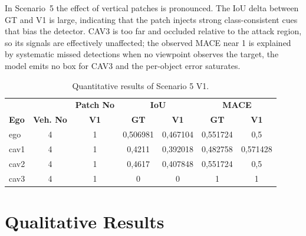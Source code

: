 In Scenario~5 the effect of vertical patches is pronounced. The IoU delta between GT and V1 is large, indicating that the patch injects strong class-consistent cues that bias the detector. 
CAV3 is too far and occluded relative to the attack region, so its signals are effectively unaffected; the observed MACE near 1 is explained by systematic missed detections when no viewpoint observes the target, the model emits no box for CAV3 and the per-object error saturates.



\begin{table}[H]
    \centering
    \caption{Quantitative results of Scenario 5 V1.}
    \label{tab:scenario5v1_results}
    \begin{tabularx}{\textwidth}{l c c c c c c}
        \toprule
            &             &   \multicolumn{1}{c}{\textbf{Patch No}}  & \multicolumn{2}{c}{\textbf{IoU}} & \multicolumn{2}{c}{\textbf{MACE}}                            \\
        \cmidrule(lr){4-5}\cmidrule(lr){6-7}
        \textbf{Ego}           &
        \textbf{Veh. No}       &
        \textbf{V1}      &
        \textbf{GT}            & \textbf{V1}  &
        \textbf{GT}            & \textbf{V1}  \\
        \midrule
        ego         & 4  & 1 & 0,506981 & 0,467104 & 0,551724 & 0,5 \\
        cav1        & 4  & 1 & 0,4211 & 0,392018 & 0,482758 & 0,571428 \\
        cav2        & 4  & 1 & 0,4617 & 0,407848 & 0,551724 & 0,5 \\
        cav3        & 4  & 1 & 0 & 0 & 1 & 1 \\
        \bottomrule
    \end{tabularx}
\end{table}

\section{Qualitative Results}
\label{sec:qualitative_results}

